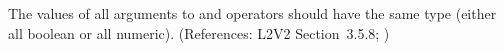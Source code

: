 The values of all arguments to  and 
operators should have the same type (either all boolean or all
numeric).   (References: L2V2 Section~3.5.8; )
